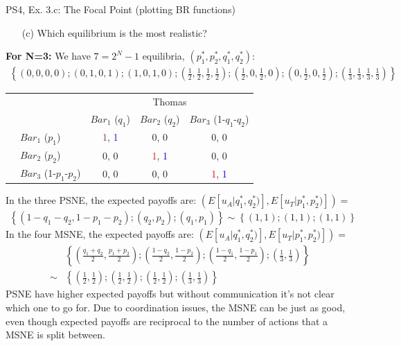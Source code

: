 \begin{frame}{PS4, Ex. 3.c: The Focal Point (plotting BR functions)}
    \begin{itemize}
      \item[(c)] Which equilibrium is the most realistic?
    \end{itemize}
    \textbf{For N=3:} We have $7=2^N-1$ equilibria, $(p_1^{*},p_2^{*},q_1^{*},q_2^{*})$:
    \begin{align*}
      \left\{(0,0,0,0);(0,1,0,1);(1,0,1,0)
      ;\left(\frac{1}{2},\frac{1}{2},\frac{1}{2},\frac{1}{2}\right)
      ;\left(\frac{1}{2},0,\frac{1}{2},0\right)
      ;\left(0,\frac{1}{2},0,\frac{1}{2}\right)
      ;\left(\frac{1}{3},\frac{1}{3},\frac{1}{3},\frac{1}{3}\right)
      \right\}
    \end{align*}
    \vspace{-12pt}
    \begin{table}
      \begin{tabular}{cl|c|c|c|}
        & \multicolumn{1}{c}{} & \multicolumn{3}{c}{\color{blue}Thomas}\\
        & \multicolumn{1}{c}{} & \multicolumn{1}{c}{$Bar_1$ ($q_1$)} & \multicolumn{1}{c}{$Bar_2$ ($q_2$)} & \multicolumn{1}{c}{$Bar_3$ (1-$q_1$-$q_2$)} \\\cline{3-5}
        \parbox[t]{1mm}{}
        & $Bar_1$ ($p_1$) & \textcolor{red}{1}, \textcolor{blue}{1} & 0, 0 & 0, 0 \\
        & $Bar_2$ ($p_2$) & 0, 0 & \textcolor{red}{1}, \textcolor{blue}{1} & 0, 0 \\
        & $Bar_3$ (1-$p_1$-$p_2$) & 0, 0 & 0, 0 & \textcolor{red}{1}, \textcolor{blue}{1} \\
      \end{tabular}
    \end{table}
    \vspace{-4pt}
    In the three PSNE, the expected payoffs are: $\left(E[u_A|q_1^{*},q_2^{*})],E[u_T|p_1^{*},p_2^{*})]\right)=$
    \begin{align*}
      \left\{(1-q_1-q_2,1-p_1-p_2);(q_2,p_2);(q_1,p_1)\right\}\sim
      \left\{(1,1);(1,1);(1,1)\right\}
    \end{align*}
    In the four MSNE, the expected payoffs are: $\left(E[u_A|q_1^{*},q_2^{*})],E[u_T|p_1^{*},p_2^{*})]\right)=$
    \begin{align*}
     &\left\{\left(\frac{q_1+q_2}{2},\frac{p_1+p_2}{2}\right)
      ;\left(\frac{1-q_2}{2},\frac{1-p_2}{2}\right)
      ;\left(\frac{1-q_1}{2},\frac{1-p_1}{2}\right)
      ;\left(\frac{1}{3},\frac{1}{3}\right)\right\} \\
     \sim
     &\left\{\left(\frac{1}{2},\frac{1}{2}\right)
      ;\left(\frac{1}{2},\frac{1}{2}\right)
      ;\left(\frac{1}{2},\frac{1}{2}\right)
      ;\left(\frac{1}{3},\frac{1}{3}\right)\right\}
    \end{align*}
    PSNE have higher expected payoffs but without communication it's not clear which one to go for. Due to coordination issues, the MSNE can be just as good, even though expected payoffs are reciprocal to the number of actions that a MSNE is split between.
\end{frame}


